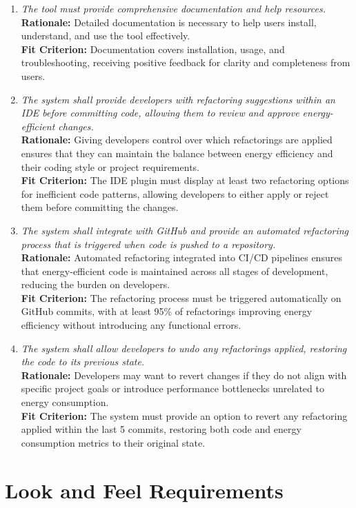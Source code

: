 \documentclass[12pt]{article}
\begin{document}
\begin{enumerate}[label=FR \arabic*., wide=0pt, leftmargin=*]
    \item \emph{The tool must provide comprehensive documentation and help resources.}\\
    {\bf Rationale:} Detailed documentation is necessary to help users install, understand, and use the tool effectively.\\
    {\bf Fit Criterion:} Documentation covers installation, usage, and troubleshooting, receiving positive feedback for clarity and completeness from users.
    \item \emph{The system shall provide developers with refactoring suggestions within an IDE before committing code, allowing them to review and approve energy-efficient changes.}\\
    {\bf Rationale:} Giving developers control over which refactorings are applied ensures that they can maintain the balance between energy efficiency and their coding style or project requirements.\\
    {\bf Fit Criterion:} The IDE plugin must display at least two refactoring options for inefficient code patterns, allowing developers to either apply or reject them before committing the changes.
    \item \emph{The system shall integrate with GitHub and provide an automated refactoring process that is triggered when code is pushed to a repository.}\\
    {\bf Rationale:} Automated refactoring integrated into CI/CD pipelines ensures that energy-efficient code is maintained across all stages of development, reducing the burden on developers.\\
    {\bf Fit Criterion:} The refactoring process must be triggered automatically on GitHub commits, with at least 95\% of refactorings improving energy efficiency without introducing any functional errors.
    \item \emph{The system shall allow developers to undo any refactorings applied, restoring the code to its previous state.}\\
    {\bf Rationale:} Developers may want to revert changes if they do not align with specific project goals or introduce performance bottlenecks unrelated to energy consumption.\\
    {\bf Fit Criterion:} The system must provide an option to revert any refactoring applied within the last 5 commits, restoring both code and energy consumption metrics to their original state.
\end{enumerate}

\section{Look and Feel Requirements}
\end{document}
